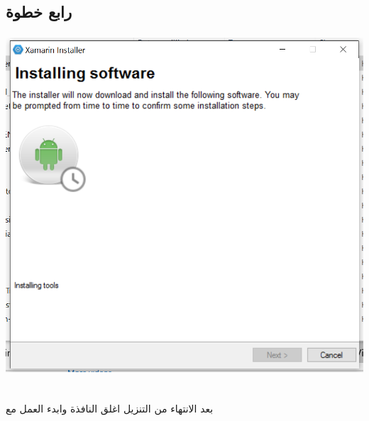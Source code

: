     \subsection{رابع خطوة }
    
    
    \begin{otherlanguage}{english}
    	
    	
    	\includegraphics[height=5in,width=6in]{installer5.png}
    	\\\\
    	
    \end{otherlanguage}
    
    بعد الانتهاء من التنزيل اغلق النافذة وابدء العمل مع 
    
 
